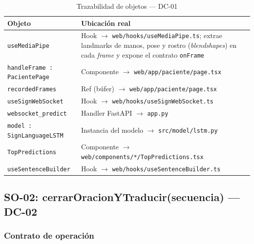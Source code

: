 \begin{table}[H]
\centering
\begin{tabularx}{\textwidth}{@{}l X@{}}
\toprule
\textbf{Objeto} & \textbf{Ubicación real} \\
\midrule
\texttt{useMediaPipe} & Hook $\rightarrow$ \texttt{web/hooks/useMediaPipe.ts}; extrae landmarks de manos, pose y rostro (\textit{blendshapes}) en cada \textit{frame} y expone el contrato \texttt{onFrame} \\
\texttt{handleFrame : PacientePage} & Componente $\rightarrow$ \texttt{web/app/paciente/page.tsx} \\
\texttt{recordedFrames} & Ref (búfer) $\rightarrow$ \texttt{web/app/paciente/page.tsx} \\
\texttt{useSignWebSocket} & Hook $\rightarrow$ \texttt{web/hooks/useSignWebSocket.ts} \\
\texttt{websocket\_predict} & Handler FastAPI $\rightarrow$ \texttt{app.py} \\
\texttt{model : SignLanguageLSTM} & Instancia del modelo $\rightarrow$ \texttt{src/model/lstm.py} \\
\texttt{TopPredictions} & Componente $\rightarrow$ \texttt{web/components/*/TopPredictions.tsx} \\
\texttt{useSentenceBuilder} & Hook $\rightarrow$ \texttt{web/hooks/useSentenceBuilder.ts} \\
\bottomrule
\end{tabularx}
\caption{Trazabilidad de objetos --- DC-01}
\label{tab:col-objetos-dc01}
\end{table}

\subsection{SO-02: cerrarOracionYTraducir(secuencia) --- DC-02}

\subsubsection{Contrato de operación}

